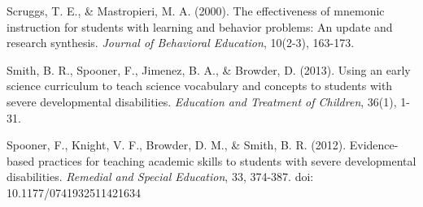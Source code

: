 \documentclass[11pt]{sig-alternate}
\begin{document}
\begin{large}
Scruggs, T. E., \& Mastropieri, M. A. (2000). The effectiveness of mnemonic instruction for students with learning and behavior problems: An update and research synthesis. \textit{Journal of Behavioral Education}, 10(2-3), 163-173.

Smith, B. R., Spooner, F., Jimenez, B. A., \& Browder, D. (2013). Using an early science curriculum to teach science vocabulary and concepts to students with severe developmental disabilities. \textit{Education and Treatment of Children}, 36(1), 1-31.

Spooner, F., Knight, V. F., Browder, D. M., \& Smith, B. R. (2012). Evidence-based practices for teaching academic skills to students with severe developmental disabilities. \textit{Remedial and Special Education}, 33, 374-387. doi: 10.1177/0741932511421634

\end{large}
\end{document}
